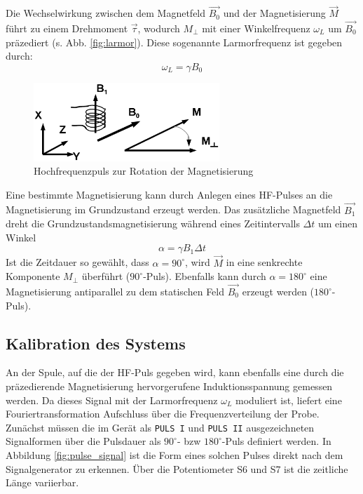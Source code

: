\documentclass[a4paper]{scrartcl} %
\begin{document}
Die Wechselwirkung zwischen dem Magnetfeld $\vec{B_0}$ und der Magnetisierung $\vec{M}$ führt zu einem Drehmoment $\vec{\tau}$, wodurch $M_{\perp}$ mit einer Winkelfrequenz $\omega_{L}$ um $\vec{B_0}$ präzediert (s. Abb. \ref{fig:larmor}). Diese sogenannte Larmorfrequenz ist gegeben durch:
\begin{equation}
\omega_{L} = \gamma B_0
\end{equation}
\begin{figure}[H]
	\centering
	\includegraphics[width=70mm]{./Resources/hf_pulse.png}
	\caption{Hochfrequenzpuls zur Rotation der Magnetisierung \autocite{skript}}
\end{figure}
Eine bestimmte Magnetisierung kann durch Anlegen eines HF-Pulses an die Magnetisierung im Grundzustand erzeugt werden. Das zusätzliche Magnetfeld $\vec{B_1}$ dreht die Grundzustandsmagnetisierung während eines Zeitintervalls $\Delta t$ um einen Winkel
\begin{equation}
\alpha = \gamma B_1 \Delta t
\end{equation}
Ist die Zeitdauer so gewählt, dass $\alpha = 90^\circ$, wird $\vec{M}$ in eine senkrechte Komponente $M_{\perp}$ überführt ($90^\circ$-Puls). Ebenfalls kann durch $\alpha = 180^\circ$ eine Magnetisierung antiparallel zu dem statischen Feld $\vec{B_0}$ erzeugt werden ($180^\circ$-Puls).

\subsection{Kalibration des Systems}

An der Spule, auf die der HF-Puls gegeben wird, kann ebenfalls eine durch die präzedierende Magnetisierung hervorgerufene Induktionsspannung gemessen werden. Da dieses Signal mit der Larmorfrequenz $\omega_L$ moduliert ist, liefert eine Fouriertransformation Aufschluss über die Frequenzverteilung der Probe.
\newline\newline
Zunächst müssen die im Gerät als \texttt{PULS I} und \texttt{PULS II} ausgezeichneten Signalformen über die Pulsdauer als $90^\circ$- bzw $180^\circ$-Puls definiert werden. In Abbildung \ref{fig:pulse_signal} ist die Form eines solchen Pulses direkt nach dem Signalgenerator zu erkennen. Über die Potentiometer S6 und S7 ist die zeitliche Länge variierbar.
\end{document}
